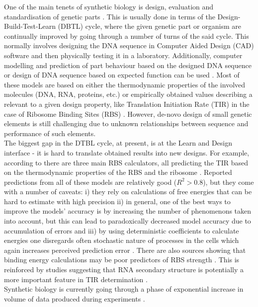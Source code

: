 \documentclass{article}
\begin{document}
One of the main tenets of synthetic biology is design, evaluation and standardisation of genetic parts \cite{Brophy2014,Canton2008,Stanton2014}.
This is usually done in terms of the Design-Build-Test-Learn (DBTL) cycle, where the given genetic part or organism are continually improved by going through a number of turns of the said cycle.
This normally involves designing the DNA sequence in Computer Aided Design (CAD) software and then physically testing it in a laboratory. 
Additionally, computer modelling and prediction of part behaviour based on the designed DNA sequence or design of DNA sequence based on expected function can be used \cite{Yeoh2019,Nielsen2016}.
Most of these models are based on either the thermodynamic properties of the involved molecules (DNA, RNA, proteins, etc.) or empirically obtained values describing a relevant to a given design property, like Translation Initiation Rate (TIR) in the case of Ribosome Binding Sites (RBS) \cite{Xia1998,Chen2013,Reeve2014}.
However, de-novo design of small genetic elements is still challenging due to unknown relationships between sequence and performance of such elements.\\
The biggest gap in the DTBL cycle, at present, is at the Learn and Design interface - it is hard to translate obtained results into new designs.
For example, according to  \textcite{Reeve2014} there are three main RBS calculators, all predicting the TIR based on the thermodynamic properties of the RBS and the ribosome \cite{Seo2013,Na2010,Salis2009}. 
Reported predictions from all of these models are relatively good ($R^2 >0.8$), 
but they come with a number of caveats: i) they rely on calculations of free energies that can be hard to estimate with high precision ii) in general, one of the best ways to improve the models' accuracy is by increasing the number of phenomenons taken into account, but this can lead to paradoxically decreased model accuracy due to accumulation of errors \cite{EspahBorujeni2016} and iii) by using deterministic coefficients to calculate energies one disregards often stochastic nature of processes in the cells which again increases perceived prediction error \cite{Goss1998}. 
There are also sources showing that binding energy calculations may be poor predictors of RBS strength \cite{Saito2020,Sherer1980}. This is reinforced by studies suggesting that RNA secondary structure is potentially a more important feature in TIR determination \cite{DESMIT1994,EspahBorujeni2016}.\\
Synthetic biology is currently going through a phase of exponential increase in volume of data produced during experiments \cite{Freemont2019}. 
\end{document}
